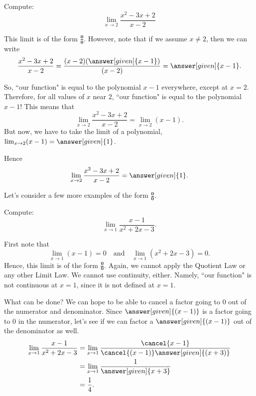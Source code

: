 \documentclass{ximera}
\begin{document}
\begin{example}
  Compute:
  \[
  \lim_{x\to 2}\frac{x^2-3x+2}{x-2}
  \]
  \begin{explanation}
  This limit is of the form $\boldsymbol{\tfrac{0}{0}}$. However, note that if we
  assume $x\ne 2$, then we can write
    \[
    \frac{x^2-3x+2}{x-2} = \frac{(x-2)(\answer[given]{x-1})}{(x-2)} = \answer[given]{x-1}.
    \]
  


      So, ``our function" is equal to the polynomial $x-1$ everywhere, except at $x=2$. Therefore, for all values of $x$ near $2$, ``our function" is equal to the polynomial $x-1$!
    This means that
    \[
    \lim_{x\to 2}\frac{x^2-3x+2}{x-2} = \lim_{x\to 2} (x-1).
    \]
    But now, we have to take the limit of a polynomial,
    $\lim_{x\to 2} (x-1) =\answer[given]{1}$.
    
     Hence
    \[
    \lim_{x\to 2}\frac{x^2-3x+2}{x-2} = \answer[given]{1}.
    \]
  \end{explanation}
\end{example} 


Let's consider a few more examples of the form $\boldsymbol{\tfrac{0}{0}}$.

\begin{example}
  Compute:
  \[
  \lim_{x\to1}\frac{x-1}{x^2+2x-3}.
  \]
  \begin{explanation}
    First note that
    \[
    \lim_{x\to1}\left(x-1\right)=0 \quad\text{and}\quad  \lim_{x\to1}\left(x^2+2x-3\right) = 0.
    \]
    Hence, this limit is of the form $\boldsymbol{\tfrac{0}{0}}$. Again, we cannot apply the Quotient Law or any other Limit Law. We cannot use continuity, either. Namely, ``our function" is not continuous at $x=1$, since it is not defined 
    at $x=1$. 
    
    What can be done? We can hope to be able to  cancel a factor going to $0$ out of the numerator and
    denominator.  Since $\answer[given]{(x-1)}$ is a factor going to $0$ in the
    numerator, let's see if we can factor a $\answer[given]{(x-1)}$ out of the
    denominator as well.
    \begin{align*}
      \lim_{x\to1}\frac{x-1}{x^2+2x-3}&=\lim_{x\to1}\frac{\cancel{x-1}}{\cancel{(x-1)}\answer[given]{(x+3)}} \\
      &=\lim_{x\to1}\frac{1}{\answer[given]{x+3}}\\
      &=\frac{1}{4}.
    \end{align*}
  \end{explanation}
\end{example}
\end{document}
